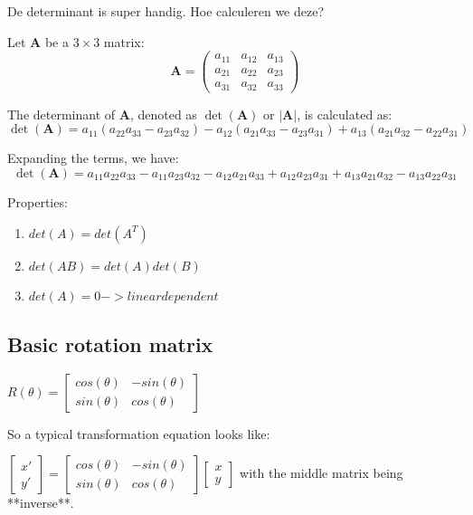 \documentclass[a4paper]{report}
\begin{document}
De determinant is super handig. Hoe calculeren we deze?

Let \(\mathbf{A}\) be a \(3 \times 3\) matrix:
\[
	\mathbf{A} =
	\begin{pmatrix}
		a_{11} & a_{12} & a_{13} \\
		a_{21} & a_{22} & a_{23} \\
		a_{31} & a_{32} & a_{33}
	\end{pmatrix}
\]

The determinant of \(\mathbf{A}\), denoted as \(\det(\mathbf{A})\) or \(|\mathbf{A}|\), is calculated as:
\[
	\det(\mathbf{A}) = a_{11}(a_{22}a_{33} - a_{23}a_{32}) - a_{12}(a_{21}a_{33} - a_{23}a_{31}) + a_{13}(a_{21}a_{32} - a_{22}a_{31})
\]

Expanding the terms, we have:
\[
	\det(\mathbf{A}) = a_{11}a_{22}a_{33} - a_{11}a_{23}a_{32} - a_{12}a_{21}a_{33} + a_{12}a_{23}a_{31} + a_{13}a_{21}a_{32} - a_{13}a_{22}a_{31}
\]

Properties:

\begin{enumerate}
	\item $det(A) = det(A^T)$
	\item $det(AB) = det(A) det(B)$
	\item $det(A) = 0 -> linear dependent$
\end{enumerate}

\subsection{Basic rotation matrix}

$R(\theta) = \begin{bmatrix} cos(\theta) & -sin(\theta) \\ sin(\theta) & cos(\theta) \end{bmatrix}$

So a typical transformation equation looks like:

$\begin{bmatrix} x' \\ y' \end{bmatrix} = \begin{bmatrix} cos(\theta) & -sin(\theta) \\ sin(\theta) & cos(\theta) \end{bmatrix} \begin{bmatrix} x \\ y \end{bmatrix}$
with the middle matrix being **inverse**.
\end{document}
